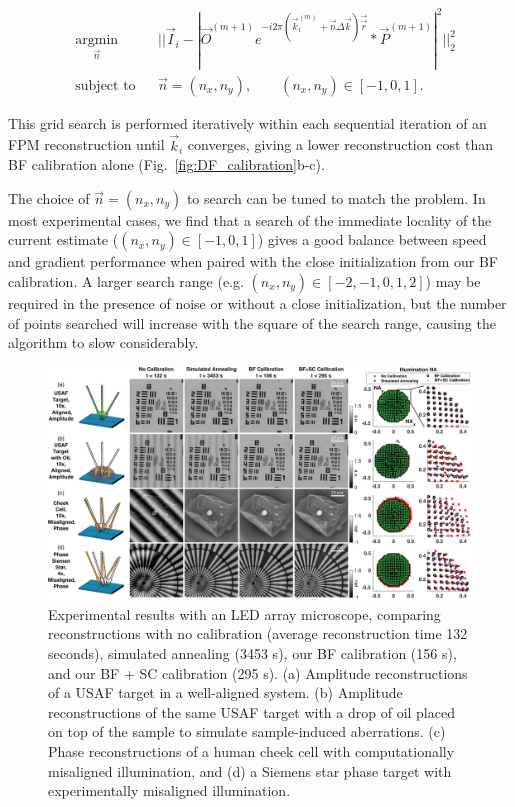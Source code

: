 \begin{equation}\label{Eq:positionOpt}
    \begin{aligned}
    & \underset{\vec{n}}{\text{argmin}}
    & & ||\vec{I}_{i}- |\vec{O}^{(m+1)} e^{-i2\pi (\vec{{k}}_i^{(m)} + \vec{n} \Delta\vec{{k}})\vec{\vec{r}}} * \vec{P}^{(m+1)}|^2||_2^2 \\
    & \text{subject to}
    & &  \vec{n} = (n_x, n_y), \qquad (n_x, n_y) \in [-1, 0 ,1].
    \end{aligned}
\end{equation}

\noindent This grid search is performed iteratively within each sequential iteration of an FPM reconstruction until $\vec{k}_i$ converges, giving a lower reconstruction cost than BF calibration alone (Fig.~\ref{fig:DF_calibration}b-c).

The choice of $\vec{n} = (n_x, n_y)$ to search can be tuned to match the problem. In most experimental cases, we find that a search of the immediate locality of the current estimate ($(n_x, n_y) \in [-1, 0 ,1]$) gives a good balance between speed and gradient performance when paired with the close initialization from our BF calibration. A larger search range (e.g. $(n_x, n_y) \in [-2, -1, 0, 1, 2]$) may be required in the presence of noise or without a close initialization, but the number of points searched will increase with the square of the search range, causing the algorithm to slow considerably.



\begin{figure} [htb]
	\centering
	\includegraphics[width=1\textwidth]{figures/fig_selfcal_fpm_mosaic.pdf}
	\caption{Experimental results with an LED array microscope, comparing reconstructions with no calibration (average reconstruction time 132 seconds), simulated annealing (3453 s), our BF calibration (156 s), and our BF + SC calibration (295 s). (a) Amplitude reconstructions of a USAF target in a well-aligned system. (b) Amplitude reconstructions of the same USAF target with a drop of oil placed on top of the sample to simulate sample-induced aberrations. (c) Phase reconstructions of a human cheek cell with computationally misaligned illumination, and (d) a Siemens star phase target with experimentally misaligned illumination.
		}
	\label{Fig:results}
\end{figure}



